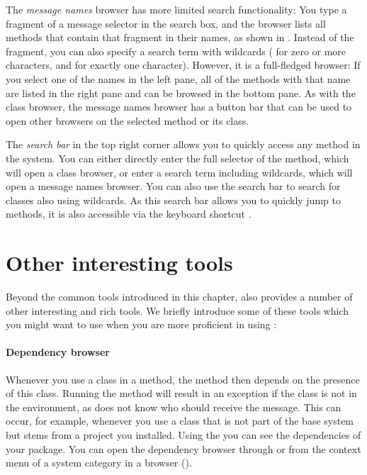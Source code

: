 \documentclass[a4paper,10pt,twoside]{book}
\begin{document}
The \emph{message names} browser has more limited search functionality:
You type a fragment of a message selector in the search box, and the browser lists all methods that contain that fragment in their names, as shown in .
Instead of the fragment, you can also specify a search term with wildcards (\ct{*} for zero or more characters, and \ct{#} for exactly one character).
However, it is a full-fledged browser:
If you select one of the names in the left pane, all of the methods with that name are listed in the right pane and can be browsed in the bottom pane.
As with the class browser, the message names browser has a button bar that can be used to open other  browsers on the selected method or its class.

The \emph{search bar} in the top right corner allows you to quickly access any method in the system.
You can either directly enter the full selector of the method, which will open a class browser, or enter a search term including wildcards, which will open a message names browser.
You can also use the search bar to search for classes also using wildcards.
As this search bar allows you to quickly jump to methods, it is also accessible via the keyboard shortcut .



\section{Other interesting tools}
Beyond the common tools introduced in this chapter, \sq also provides a number of other interesting and rich tools.
We briefly introduce some of these tools which you might want to use when you are more proficient in using \sq:

\paragraph{Dependency browser}
Whenever you use a class in a method, the method then depends on the presence of this class.
Running the method will result in an exception if the class is not in the environment, as \sq does not know who should receive the message.
This can occur, for example, whenever you use a class that is not part of the base system but stems from a project you installed.
Using the  you can see the dependencies of your package.
You can open the dependency browser through  or from the context menu of a system category in a browser ().
\end{document}
